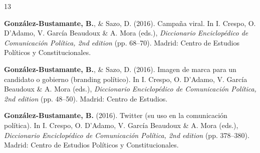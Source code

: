 \begin{publications}
\begin{benumerate}{13}

\item{{\bfseries González-Bustamante, B.}, \& Sazo, D. (2016). Campaña viral. In I. Crespo, O. D'Adamo, V. García Beaudoux \& A. Mora (eds.), {\itshape Diccionario Enciclopédico de Comunicación Política, 2nd edition} (pp. 68--70). Madrid: Centro de Estudios Políticos y Constitucionales.}\vspace{1mm}


\item{{\bfseries González-Bustamante, B.}, \& Sazo, D. (2016). Imagen de marca para un candidato o gobierno (branding político). In I. Crespo, O. D'Adamo, V. García Beaudoux \& A. Mora (eds.), {\itshape Diccionario Enciclopédico de Comunicación Política, 2nd edition} (pp. 48--50). Madrid: Centro de Estudios.}\vspace{1mm}


\item{{\bfseries González-Bustamante, B.} (2016). Twitter (su uso en la comunicación política). In I. Crespo, O. D'Adamo, V. García Beaudoux \& A. Mora (eds.), {\itshape Diccionario Enciclopédico de Comunicación Política, 2nd edition} (pp. 378--380). Madrid: Centro de Estudios Políticos y Constitucionales.}\vspace{1mm}


\end{benumerate}
\end{publications}
